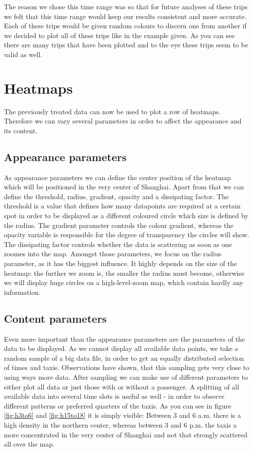 \documentclass[11pt,conference,a4paper,twocolumns,romanappendices]{IEEEtran}
\begin{document}
The reason we chose this time range was so that for future analyses of these trips we felt that this time range would keep our results consistent and more accurate. Each of these trips would be given random colours to discern one from another if we decided to plot all of these trips like in the example given. As you can see there are many trips that have been plotted and to the eye these trips seem to be valid as well. \\

\section{Heatmaps}
The previously treated data can now be used to plot a row of heatmaps. Therefore we can vary several parameters in order to affect the appearance and its content. \\
\subsection{Appearance parameters}
As appearance parameters we can define the center position of the heatmap which will be positioned in the very center of Shanghai. Apart from that we can define the threshold, radius, gradient, opacity and a dissipating factor. The threshold is a value that defines how many datapoints are required at a certain spot in order to be displayed as a different coloured circle which size is defined by the radius. The gradient parameter controls the colour gradient, whereas the opacity variable is responsible for the degree of transparency the circles will show. The dissipating factor controls whether the data is scattering as soon as one zoomes into the map.
Amongst those parameters, we focus on the radius parameter, as it has the biggest influence. It highly depends on the size of the heatmap: the further we zoom is, the smaller the radius must become, otherwise we will display huge circles on a high-level-zoom map, which contain hardly any information.

\subsection{Content parameters}
Even more important than the appearance parameters are the parameters of the data to be displayed.
As we cannot display all available data points, we take a random sample of a big data file, in order to get an equally distributed selection of times and taxis. Observations have shown, that this sampling gets very close to using ways more data.
After sampling we can make use of different parameters to either plot all data or just those with or without a passenger.
A splitting of all available data into several time slots is useful as well - in order to observe different patterns or preferred quarters of the taxis.
As you can see in figure \ref{fig:h3to6} and \ref{fig:h15to18} it is simply visible: Between 3 and 6 a.m. there is a high density in the northern center, whereas between 3 and 6 p.m. the taxis a more concentrated in the very center of Shanghai and not that strongly scattered all over the map.
\end{document}
